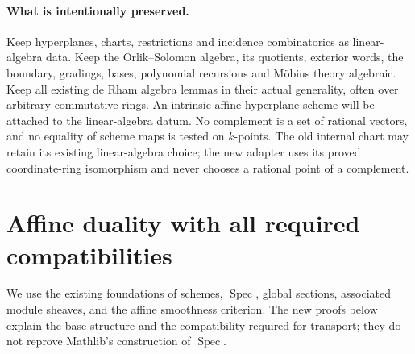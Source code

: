 \documentclass[11pt]{article}
\newcommand{\Spec}{\operatorname{Spec}}
\theoremstyle{definition}
\theoremstyle{remark}
\renewcommand{\Spec}{\ensuremath{\operatorname{Spec}}}
\begin{document}
\paragraph{What is intentionally preserved.}
Keep hyperplanes, charts, restrictions and incidence combinatorics as linear-algebra data. Keep the Orlik--Solomon algebra, its quotients, exterior words, the boundary, gradings, bases, polynomial recursions and M\"obius theory algebraic. Keep all existing de Rham algebra lemmas in their actual generality, often over arbitrary commutative rings. An intrinsic affine hyperplane scheme will be attached to the linear-algebra datum. No complement is a set of rational vectors, and no equality of scheme maps is tested on $k$-points. The old internal chart may retain its existing linear-algebra choice; the new adapter uses its proved coordinate-ring isomorphism and never chooses a rational point of a complement.

\section{Affine duality with all required compatibilities}

We use the existing foundations of schemes, \Spec, global sections, associated module sheaves, and the affine smoothness criterion. The new proofs below explain the base structure and the compatibility required for transport; they do not reprove Mathlib's construction of \Spec.
\end{document}
